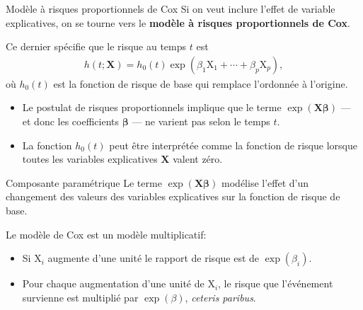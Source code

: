 \documentclass[
  ignorenonframetext,
]{beamer}
\providecommand{\tightlist}{%
  \setlength{\itemsep}{0pt}\setlength{\parskip}{0pt}}\usepackage{longtable,booktabs,array}
\begin{document}
\begin{frame}{Modèle à risques proportionnels de Cox}
\protect\hypertarget{moduxe8le-uxe0-risques-proportionnels-de-cox}{}
Si on veut inclure l'effet de variable explicatives, on se tourne vers
le \textbf{modèle à risques proportionnels de Cox}.

Ce dernier spécifie que le risque au temps \(t\) est \begin{align*}
h(t; \mathbf{X}) = h_0(t)\exp(\beta_1\mathrm{X}_1 + \cdots + \beta_p \mathrm{X}_p),
\end{align*} où \(h_0(t)\) est la fonction de risque de base qui
remplace l'ordonnée à l'origine.

\begin{itemize}
\tightlist
\item
  Le postulat de risques proportionnels implique que le terme
  \(\exp(\mathbf{X}\boldsymbol{\beta})\) --- et donc les coefficients
  \(\boldsymbol{\beta}\) --- ne varient pas selon le temps \(t\).
\item
  La fonction \(h_0(t)\) peut être interprétée comme la fonction de
  risque lorsque toutes les variables explicatives \(\mathbf{X}\) valent
  zéro.
\end{itemize}
\end{frame}

\begin{frame}{Composante paramétrique}
\protect\hypertarget{composante-paramuxe9trique}{}
Le terme \(\exp(\mathbf{X}\boldsymbol{\beta})\) modélise l'effet d'un
changement des valeurs des variables explicatives sur la fonction de
risque de base.

Le modèle de Cox est un modèle multiplicatif:

\begin{itemize}
\tightlist
\item
  Si \(\mathrm{X}_i\) augmente d'une unité le rapport de risque est de
  \(\exp(\beta_i)\).
\item
  Pour chaque augmentation d'une unité de \(\mathrm{X}_i\), le risque
  que l'événement survienne est multiplié par \(\exp(\beta)\),
  \emph{ceteris paribus}.
\end{itemize}
\end{frame}
\end{document}
